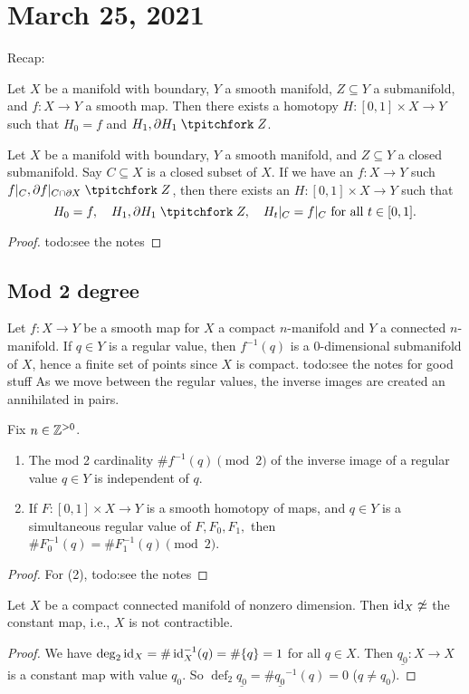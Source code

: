 \section{March 25, 2021} 
Recap:
\begin{theorem}
    Let $X$ be a manifold with boundary, $Y$ a smooth manifold, $Z \subseteq Y$ a submanifold, and $f \colon X \to Y$ a smooth map. Then there exists a homotopy $H \colon [0,1] \times X \to Y$ such that $H_0=f$ and $H_1, \partial H_1\transv Z$.
\end{theorem}

\begin{theorem}
    Let $X$ be a manifold with boundary, $Y$ a smooth manifold, and $Z \subseteq Y$ a closed submanifold. Say $C \subseteq X$ is a closed subset of $X$. If we have an $f \colon X \to Y$ such $f|_C,\partial f|_{C\cap \partial X}\transv Z$, then there exists an $H \colon [0,1] \times X \to Y$ such that \[
        H_0=f,\quad H_1,\partial H_1\transv Z,\quad H_t|_C=f|_C \ \text{for all} \ t \in [0,1].
    \] 
\end{theorem}
\begin{proof}
    {\color{red}todo:see the notes} 
\end{proof}

\subsection{Mod 2 degree}
Let $f \colon X \to Y$ be a smooth map for $X$ a compact $n$-manifold and $Y$ a connected $n$-manifold.  If $q \in Y$ is a regular value, then $f ^{-1}(q)$ is a $0$-dimensional submanifold of $X$, hence a finite set of points since $X$ is compact. {\color{red}todo:see the notes for good stuff}  As we move between the regular values, the inverse images are created an annihilated in pairs.

\begin{theorem}
    Fix $n \in \mathbb{Z}^{>0}$.
    \begin{enumerate}[label=(\arabic*)]
        \item The mod 2 cardinality $\# f ^{-1}(q)\pmod 2$ of the inverse image of a regular value $q \in Y$ is independent of $q$.
        \item If $F \colon [0,1]\times X \to Y$ is a smooth homotopy of maps, and $q \in Y$ is a simultaneous regular value of $F,F_0,F_1,$ then $\# F_0^{-1}(q)=\#F^{-1}_1(q)\pmod 2$.
    \end{enumerate}
\end{theorem}
\begin{proof}
    For (2), {\color{red}todo:see the notes} 
\end{proof}
\begin{prop}
    Let $X$ be a compact connected manifold of nonzero dimension. Then $\operatorname{id}_X\not\simeq $ the constant map, i.e., $X$ is not contractible.
\end{prop}
\begin{proof}
    We have $\operatorname{deg}_2\operatorname{id}_X=\#\operatorname{id}_X ^{-1}(q)=\#\{q\} =1$ for all $q \in X$. Then $\underline{q_0}\colon X \to X$ is a constant map with value $q_0$.  So $\operatorname{def}_2\underline{q_0}=\# \underline{q_0}^{-1}(q)=0$ ($q\neq q_0$).
\end{proof}

